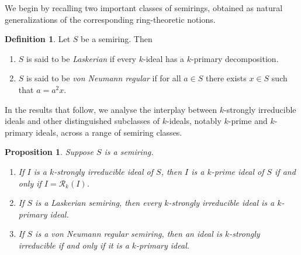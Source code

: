 \documentclass[11pt,english]{amsart}
\newtheorem{proposition}[theorem]{Proposition}
\theoremstyle{definition}
\newtheorem{definition}[theorem]{Definition}
\numberwithin{equation}{section}
\begin{document}
We begin by recalling two important classes of semirings, obtained as natural generalizations of the corresponding ring-theoretic notions.
\begin{definition}
Let $S$ be a semiring. Then
    \begin{enumerate}
        \item $S$ is said to be \emph{Laskerian} if every $k$-ideal has a $k$-primary decomposition.
        \item $S$ is said to be \emph{von Neumann regular} if for all $a\in S$ there exists $x\in S$ such that $a=a^2x$.
    \end{enumerate}
    
\end{definition}
In the results that follow, we analyse the interplay between $k$-strongly irreducible ideals and other distinguished subclasses of $k$-ideals, notably $k$-prime and $k$-primary ideals, across a range of semiring classes.

\begin{proposition}\label{loc3}
Suppose $S$ is a semiring. 
\begin{enumerate}
\item If $I$ is a $k$-strongly irreducible ideal of $S$, then $I$ is a $k$-prime ideal of $S$ if and only if $I=\mathcal{R}_k(I)$.
\item If $S$ is a Laskerian semiring, then every $k$-strongly irreducible ideal is a $k$-primary ideal.

\item If $S$ is a von Neumann regular semiring, then an ideal is $k$-strongly irreducible if and only if
it is a $k$-primary ideal.
\end{enumerate}
\end{proposition}
\end{document}
